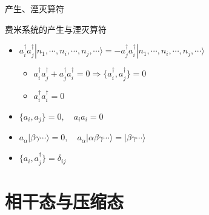 \documentclass{beamer}
\begin{document}
    \begin{frame}{产生、湮灭算符}
	\begin{block}{费米系统的产生与湮灭算符}
		\begin{itemize}
			\item\small{ $a_{i}^{\dagger}a_{j}^{\dagger}|n_{1},\cdots,n_{i},\cdots,n_{j},\cdots\rangle=-a_{j}^{\dagger}a_{i}^{\dagger}|n_{1},\cdots,n_{i},\cdots,n_{j},\cdots\rangle$}
			\begin{itemize}
				\item $a_{i}^{\dagger}a_{j}^{\dagger}+a_{j}^{\dagger}a_{i}^{\dagger}=0\Rightarrow \{a_{i}^{\dagger},a_{j}^{\dagger}\}=0$
				\item $a_{i}^{\dagger}a_{i}^{\dagger}=0$
			\end{itemize}
			\item $\{a_{i},a_{j}\}=0,\quad a_{i}a_{i}=0$
			\item $a_{\alpha}|\beta \gamma\cdots\rangle=0,\quad a_{\alpha}|\alpha\beta \gamma\cdots\rangle=|\beta \gamma\cdots\rangle$
			\item $\{a_{i},a_{j}^{\dagger}\}=\delta_{ij}$
		\end{itemize}
	\end{block}
    \end{frame}
\section{相干态与压缩态}
\end{document}
